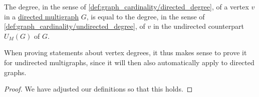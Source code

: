 \begin{proposition}\label{thm:degree_of_undirected_counterpart}
  The degree, in the sense of \cref{def:graph_cardinality/directed_degree}, of a vertex \( v \) in a \hyperref[def:directed_multigraph]{directed multigraph} \( G \), is equal to the degree, in the sense of \cref{def:graph_cardinality/undirected_degree}, of \( v \) in the undirected counterpart \( \hyperref[def:graph_functors/multi_forgetful]{U_M}(G) \) of \( G \).
\end{proposition}
\begin{comments}
  \item When proving statements about vertex degrees, it thus makes sense to prove it for undirected multigraphs, since it will then also automatically apply to directed graphs.
\end{comments}
\begin{proof}
  We have adjusted our definitions so that this holds.
\end{proof}

